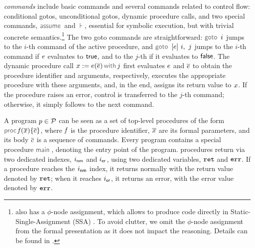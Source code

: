 \jsil \emph{commands} include \jsil basic commands and several commands related to control flow: conditional gotos, unconditional gotos, dynamic procedure calls, and two special commands, $\assume$ and $\assert$, essential for symbolic execution, but with trivial concrete semantics.\footnote{\jsil also has a $\phi$-node assignment, which allows \JSComp to produce code directly in Static-Single-Assignment (SSA) \cite{SSA}. To avoid clutter, we omit the $\phi$-node assignment from the formal presentation as it does not impact the reasoning. Details can be found in \cite{javert}.} 
The two goto commands are straightforward: $\goto \ i$ jumps to the $i$-th command of the active procedure, and $\ifgoto{\jsilexpr}{i}{j}$ jumps to the $i$-th command if $e$ evaluates to ${\sf true}$, and to the $j$-th if it evaluates to ${\sf false}$. 
The dynamic procedure call $\jsilcall{\jvar}{\jsilexpr}{\jvec{\jsilexpr}}{j}$ first evaluates  $e$ and $\overline{e}$ to obtain the procedure identifier and arguments, respectively, executes the appropriate procedure with these arguments, and, in the end, assigns its return value to $x$.
If the procedure raises an error, control is transferred to the $j$-th command; otherwise, it simply follows to the next command. 

A \jsil program $p \in \mathcal{P}$ can be seen as a set of top-level procedures of the form $\procedure{\pid}{\jvec{\jvar}}{\jvec{\jcmd}}$, where $\mathit{f}$ is the procedure identifier, $\overline{x}$ are its formal parameters, and its body ${\overline{c}}$  is a sequence of \jsil commands.
Every \jsil program contains a special procedure $\jsilmain$\hspace{-2pt}, denoting the entry point of the program. 
\jsil procedures return via two dedicated indexes, $i_{{\sf nm}}$ and $i_{{\sf er}}$, using two dedicated variables, $\mathtt{ret}$ and $\mathtt{err}$. If a procedure reaches the $i_{{\sf nm}}$ index, it returns normally with the return value denoted by $\mathtt{ret}$; when it reaches $i_{{\sf er}}$, it returns an error, with the error value denoted by $\mathtt{err}$.


